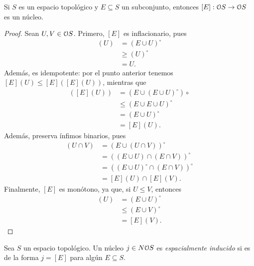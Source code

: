 \begin{proposition}
  Si $S$ es un espacio topológico y $E\subseteq S$ un
  subconjunto, entonces $[E]:\cal OS\to\cal OS$ es un núcleo.
\end{proposition}
\begin{proof}
  Sean $U,V\in\cal OS$.
  Primero, $[E]$ es inflacionario, pues
  \begin{align*}
    [E](U)
    &= (E\cup U)^\circ \\
    &\geq (U)^\circ \\
    &= U.
  \end{align*}
  Además, es idempotente: por el punto anterior
  tenemos $[E](U)\leq[E]([E](U))$, mientras que
  \begin{align*}
    [E]([E](U))
    &= (E\cup (E\cup U)^\circ)\circ \\
    &\leq (E\cup E\cup U)^\circ \\
    &= (E\cup U)^\circ \\
    &= [E](U).
  \end{align*}
  Además, preserva ínfimos binarios, pues
  \begin{align*}
    [E](U\cap V)
    &= (E\cup(U\cap V))^\circ \\
    &= ((E\cup U)\cap(E\cap V))^\circ \\
    &= ((E\cup U)^\circ\cap(E\cap V))^\circ \\
    &= [E](U)\cap[E](V).
  \end{align*}
  Finalmente, $[E]$ es monótono, ya que, si $U\leq V$, entonces
  \begin{align*}
    [E](U)
    &= (E\cup U)^\circ \\
    &\leq (E\cup V)^\circ \\
    &= [E](V).
  \end{align*}
\end{proof}

\begin{definition}
  Sea $S$ un espacio topológico.
  Un núcleo $j\in N\cal O S$ es \emph{espacialmente
  inducido} si es de la forma $j=[E]$ para algún
  $E\subseteq S$.
\end{definition}

